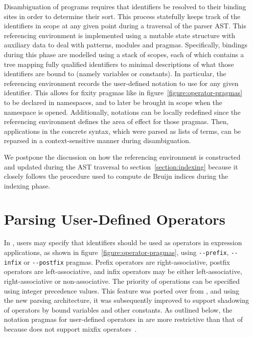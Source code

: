 Disambiguation of \Beluga programs requires that identifiers be resolved to their binding sites in order to determine their sort.
This process statefully keeps track of the identifiers in scope at any given point during a traversal of the parser \ac{AST}.
This referencing environment is implemented using a mutable state structure with auxiliary data to deal with patterns, modules and pragmas.
Specifically, bindings during this phase are modelled using a stack of scopes, each of which contains a tree mapping fully qualified identifiers to minimal descriptions of what those identifiers are bound to (namely variables or constants).
In particular, the referencing environment records the user-defined notation to use for any given identifier.
This allows for fixity pragmas like in figure~\ref{figure:operator-pragmas} to be declared in namespaces, and to later be brought in scope when the namespace is opened.
Additionally, notations can be locally redefined since the referencing environment defines the area of effect for those pragmas.
Then, applications in the concrete syntax, which were parsed as lists of terms, can be reparsed in a context-sensitive manner during disambiguation.

We postpone the discussion on how the referencing environment is constructed and updated during the \ac{AST} traversal to section~\ref{section:indexing} because it closely follows the procedure used to compute de Bruijn indices during the indexing phase.

\section{Parsing User-Defined Operators}\label{section:parsing-user-defined-operators}

In \Beluga, users may specify that identifiers should be used as operators in expression applications, as shown in figure~\ref{figure:operator-pragmas}, using \verb|--prefix|, \verb|--infix| or \verb|--postfix| pragmas.
Prefix operators are right-associative, postfix operators are left-associative, and infix operators may be either left-associative, right-associative or non-associative.
The priority of operations can be specified using integer precedence values.
This feature was ported over from \Twelf, and using the new parsing architecture, it was subsequently improved to support shadowing of operators by bound variables and other constants.
As outlined below, the notation pragmas for user-defined operators in \Beluga are more restrictive than that of \Agda because \Beluga does not support mixfix operators~\cite{danielsson2008parsing}.

